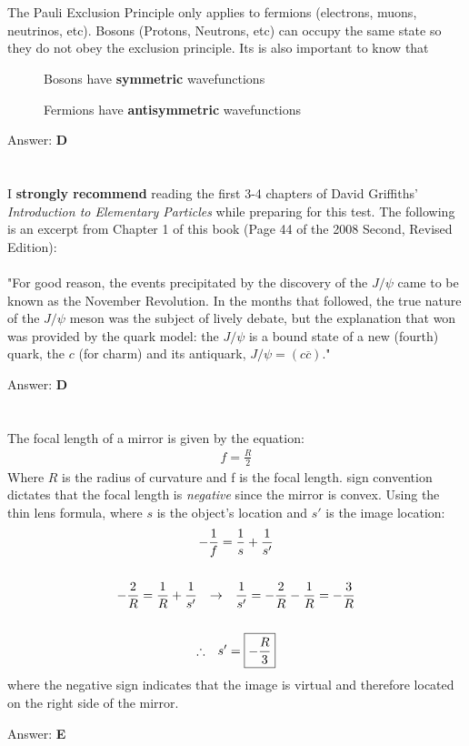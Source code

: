 \documentclass[12pt]{article}
\newcommand{\Answer}[1]{Answer: \textbf{#1}}
\newcommand{\Problem}[3]{
    \setcounter{section}{#1}
    \addtocounter{section}{-1}
    \section{}
    #3\par\par
    \Answer{#2}
}
\begin{document}
\Problem{72}{D}{%
The Pauli Exclusion Principle only applies to fermions (electrons, muons, neutrinos, etc). Bosons (Protons, Neutrons, etc) can occupy the same state so they do not obey the exclusion principle. Its is also important to know that
\begin{description}
\item[] Bosons have \textbf{symmetric} wavefunctions
\item[] Fermions have \textbf{antisymmetric} wavefunctions
\end{description}
}

\Problem{73}{D}{%
I \textbf{strongly recommend} reading the first 3-4 chapters of David Griffiths' \textit{Introduction to Elementary Particles} while preparing for this test. The following is an excerpt from Chapter 1 of this book (Page 44 of the 2008 Second, Revised Edition):\\\\
"For good reason, the events precipitated by the discovery of the $J / \psi$ came to be known as the November Revolution. In the months that followed, the true nature of the $J / \psi$ meson was the subject of lively debate, but the explanation that won was provided by the quark model: the $J / \psi$ is a bound state of a new (fourth) quark, the $c$ (for charm) and its antiquark, $J / \psi = (c \overline{c})$."
}


\Problem{74}{E}{%
The focal length of a mirror is given by the equation:
\begin{align}
f = \frac{R}{2}
\end{align}
Where $R$ is the radius of curvature and f is the focal length. sign convention dictates that the focal length is \textit{negative} since the mirror is convex. Using the thin lens formula, where $s$ is the object's location and $s'$ is the image location:
\begin{gather}
-\frac{1}{f} = \frac{1}{s} + \frac{1}{s'} \\
\nonumber\\
-\frac{2}{R} = \frac{1}{R} + \frac{1}{s'} \hspace{.1in} \rightarrow  \hspace{.1in} \frac{1}{s'} =  -\frac{2}{R} - \frac{1}{R} = -\frac{3}{R} \nonumber\\
\nonumber\\
\therefore \hspace{.1in} s' = \boxed{-\frac{R}{3}}\nonumber
\end{gather}
where the negative sign indicates that the image is virtual and therefore located on the right side of the mirror.
}
\end{document}
